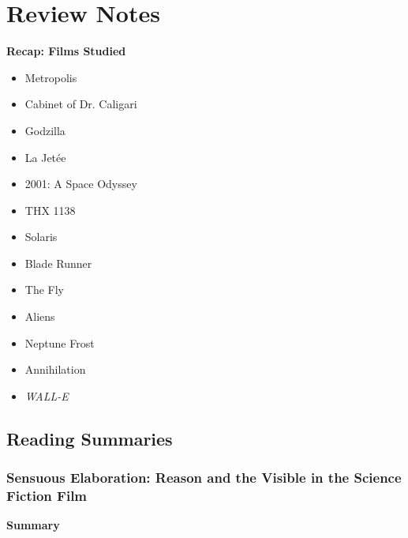 \documentclass[11pt,fleqn]{book}
\begin{document}
\chapter{Review Notes}
\textbf{Recap: Films Studied}
\begin{itemize}
    \item Metropolis
    \item Cabinet of Dr. Caligari 
    \item Godzilla
    \item La Jetée
    \item 2001: A Space Odyssey
    \item THX 1138
    \item Solaris
    \item Blade Runner
    \item The Fly
    \item Aliens
    \item Neptune Frost
    \item Annihilation
    \item \textit{WALL-E}
\end{itemize}


\section{Reading Summaries}
\subsection{Sensuous Elaboration: Reason and the Visible in the Science Fiction Film}
\textbf{Summary}
\end{document}
